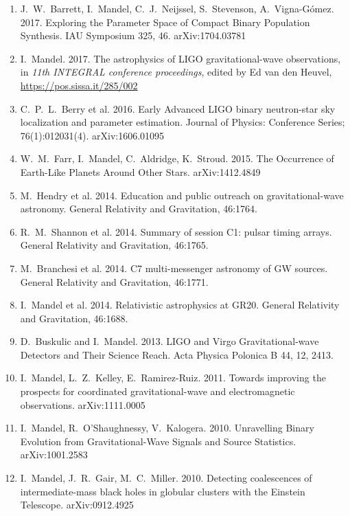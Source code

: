 \documentclass[margin,line]{res}
\begin{document}
\begin{resume}
\begin{enumerate}
\item J.~W.~Barrett, I.~Mandel, C.~J.~Neijssel, S.~Stevenson, A.~Vigna-G\'{o}mez. 2017. Exploring the Parameter Space of Compact Binary Population Synthesis. IAU Symposium 325, 46. arXiv:1704.03781 

\item I.~Mandel.  2017. The astrophysics of LIGO gravitational-wave observations, in {\it 11th INTEGRAL conference proceedings}, edited by Ed van den Heuvel, \url{https://pos.sissa.it/285/002}

\item C.~P.~L.~Berry et al.  2016.  Early Advanced LIGO binary neutron-star sky localization and parameter estimation.  Journal of Physics: Conference Series; 76(1):012031(4).  arXiv:1606.01095

\item W.~M.~Farr, I.~Mandel, C.~Aldridge, K.~Stroud. 2015. The Occurrence of Earth-Like Planets Around Other Stars.  arXiv:1412.4849
  
\item M.~Hendry et al. 2014. Education and public outreach on gravitational-wave astronomy.  General Relativity and Gravitation, 46:1764.

\item R.~M.~Shannon et al. 2014. Summary of session C1: pulsar timing arrays. General Relativity and Gravitation, 46:1765.

\item M.~Branchesi et al. 2014.  C7 multi-messenger astronomy of GW sources.
General Relativity and Gravitation, 46:1771.

\item I.~Mandel et al.  2014.  Relativistic astrophysics at GR20.  General Relativity and Gravitation, 46:1688.

\item D.~Buskulic and I.~Mandel.  2013.  LIGO and Virgo Gravitational-wave Detectors and Their Science Reach.  Acta Physica Polonica B 44, 12, 2413.

\item I.~Mandel, L.~Z.~Kelley, E.~Ramirez-Ruiz. 2011. Towards improving the prospects for coordinated gravitational-wave and electromagnetic observations. arXiv:1111.0005
 
\item I.~Mandel, R.~O'Shaughnessy, V.~Kalogera.  2010.  Unravelling Binary Evolution from Gravitational-Wave Signals and Source Statistics. arXiv:1001.2583 

\item I.~Mandel, J.~R.~Gair, M.~C.~Miller.  2010.  Detecting coalescences of intermediate-mass black holes in globular clusters with the Einstein Telescope.  arXiv:0912.4925  


\end{enumerate}
\end{resume}
\end{document}
